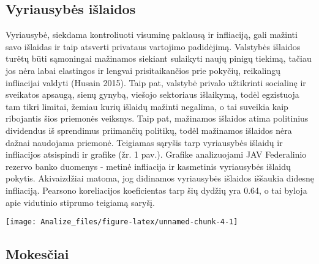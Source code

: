 \documentclass[
]{article}
\let\origfigure\figure
\let\endorigfigure\endfigure
\renewenvironment{figure}[1][2] {
    \expandafter\origfigure\expandafter[H]
} {
    \endorigfigure
}
\begin{document}
\hypertarget{vyriausybux117s-iux161laidos}{%
\subsection{Vyriausybės išlaidos}\label{vyriausybux117s-iux161laidos}}

Vyriausybė, siekdama kontroliuoti visuminę paklausą ir infliaciją, gali
mažinti savo išlaidas ir taip atsverti privataus vartojimo padidėjimą.
Valstybės išlaidos turėtų būti sąmoningai mažinamos siekiant sulaikyti
naujų pinigų tiekimą, tačiau jos nėra labai elastingos ir lengvai
prisitaikančios prie pokyčių, reikalingų infliacijai valdyti (Husain
2015). Taip pat, valstybė privalo užtikrinti socialinę ir sveikatos
apsaugą, sienų gynybą, viešojo sektoriaus išlaikymą, todėl egzistuoja
tam tikri limitai, žemiau kurių išlaidų mažinti negalima, o tai suveikia
kaip ribojantis šios priemonės veiksnys. Taip pat, mažinamos išlaidos
atima politinius dividendus iš sprendimus priimančių politikų, todėl
mažinamos išlaidos nėra dažnai naudojama priemonė. Teigiamas sąryšis
tarp vyriausybės išlaidų ir infliacijos atsispindi ir grafike (žr. 1
pav.). Grafike analizuojami JAV Federalinio rezervo banko duomenys -
metinė infliacija ir kasmetinis vyriausybės išlaidų pokytis.
Akivaizdžiai matoma, jog didinamos vyriausybės išlaidos iššaukia didesnę
infliaciją. Pearsono koreliacijos koeficientas tarp šių dydžių yra 0.64,
o tai byloja apie vidutinio stiprumo teigiamą saryšį.

\begin{figure}

{\centering \texttt{[image: Analize\_files/figure-latex/unnamed-chunk-4-1]} 

}

\caption{JAV vyriausybės išlaidos ir infliacija (1960-2019m).}\label{fig:unnamed-chunk-4}
\end{figure}

\hypertarget{mokesux10diai}{%
\subsection{Mokesčiai}\label{mokesux10diai}}
\end{document}
